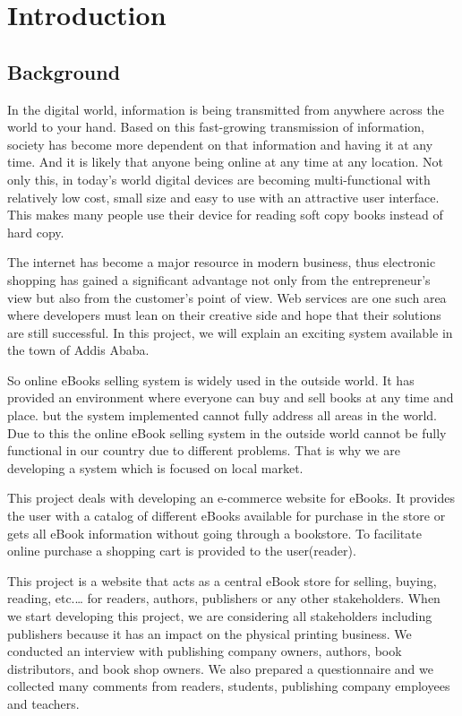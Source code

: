 \chapter{Introduction}
\section{Background}

In the digital world, information is being transmitted from anywhere across the world to your hand. Based on this fast-growing transmission of information, society has become more dependent on that information and having it at any time. And it is likely that anyone being online at any time at any location. Not only this, in today’s world digital devices are becoming multi-functional with relatively low cost, small size and easy to use with an attractive user interface. This makes many people use their device for reading soft copy books instead of hard copy.
	
The internet has become a major resource in modern business, thus electronic shopping has gained a significant advantage not only from the entrepreneur’s view but also from the customer’s point of view. Web services are one such area where developers must lean on their creative side and hope that their solutions are still successful. In this project, we will explain an exciting system available in the town of Addis Ababa.


So online eBooks selling system is widely used in the outside world. It has provided an environment where everyone can buy and sell books at any time and place. but the system implemented cannot fully address all areas in the world. Due to this the online eBook selling system in the outside world cannot be fully functional in our country due to different problems. That is why we are developing a system which is focused on local market.

This project deals with developing an e-commerce website for eBooks. It provides the user with a catalog of different eBooks available for purchase in the store or gets all eBook information without going through a bookstore. To facilitate online purchase a shopping cart is provided to the user(reader).

This project is a website that acts as a central eBook store for selling, buying, reading, etc.… for readers, authors, publishers or any other stakeholders. When we start developing this project, we are considering all stakeholders including publishers because it has an impact on the physical printing business.  We conducted an interview with publishing company owners, authors, book distributors, and book shop owners. We also prepared a questionnaire and we collected many comments from readers, students, publishing company employees and teachers.


